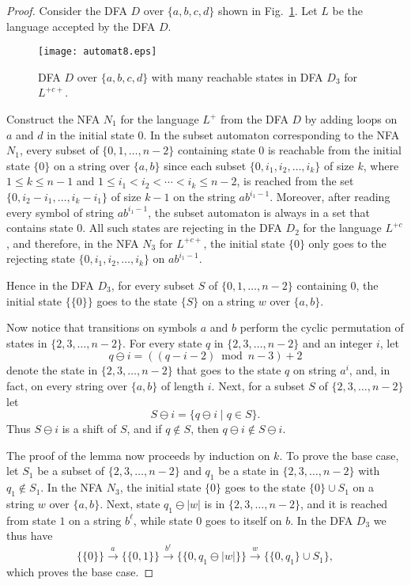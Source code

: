 \documentclass[runningheads]{llncs}
\begin{document}
\begin{proof}
 Consider the DFA $D$ over $\{a,b,c,d\}$
 shown in  Fig.~\ref{fig:max_reach}.
 Let $L$ be the language accepted by the DFA $D$.
 
 \begin{figure}[t]\label{-----fig5}
 \centering
 \texttt{[image: automat8.eps]}
 \caption{DFA $D$ over $\{a,b,c,d\}$ with many reachable states in 
         DFA $D_3$ for $L^{+c+}$.}
 \label{fig:max_reach}
 \end{figure}

 Construct the NFA $N_1$ for the language $L^+$ from the DFA $D$
 by adding loops on $a$ and $d$ in the initial state $0$.
 In the subset automaton corresponding to the NFA $N_1$,
 every subset of $\{0,1,\ldots,n-2\}$ containing state $0$
 is reachable from the initial state $\{0\}$ on a string over $\{a,b\}$
 since each subset $\{0,i_1,i_2,\ldots, i_k\}$ of size $k$,
 where $1\le k\le n-1$ and $1\le i_1<i_2<\cdots<i_k\le n-2$,
 is reached from the set $\{0,i_2-i_1,\ldots,i_k-i_1\}$ of size $k-1$
 on the string $ab^{i_1-1}$.
 Moreover, after reading every symbol of string $ab^{i_1-1}$,
 the subset automaton is always in a set that contains state $0$.
 All such states are rejecting in the DFA $D_2$ for the language $L^{+c}$,
 and therefore, in the NFA $N_3$ for $L^{+c+}$,
 the initial state $\{0\}$ only goes to the rejecting state
 $\{0,i_1,i_2,\ldots, i_k\}$ on $ab^{i_1-1}$.

 Hence in the DFA $D_3$, for every subset $S$  of $\{0,1,\ldots,n-2\}$
 containing  $0$,
 the initial state $\{\{0\}\}$ goes to the state $\{S\}$
 on a string $w$ over $\{a,b\}$.

 Now notice that transitions on symbols $a$ and $b$
 perform the cyclic permutation of states  in $\{2,3,\ldots,n-2\}$.
 For every state $q$ in $\{2,3,\ldots,n-2\}$ and an integer $i$,
 let 
 $$
    q\ominus i = ((q-i-2) \bmod n-3) + 2
 $$
 denote the state in $\{2,3,\ldots,n-2\}$
 that goes to the state $q$ on string $a^i$,
 and, in fact, on every string over $\{a,b\}$ of length $i$.
 Next, for a subset $S$ of $\{2,3,\ldots,n-2\}$ let
 $$
    S\ominus i=\{q\ominus i\mid q\in S\}.
 $$
 Thus $S\ominus i$ is a shift of $S$,
 and if $q\notin S$, then $q\ominus i\notin S\ominus i$.

 The proof of the lemma now proceeds by induction on $k$.
 To prove the base case, let $S_1$ be a subset of $\{2,3,\ldots,n-2\}$
 and $q_1$ be a state in $\{2,3,\ldots,n-2\}$ with $q_1\notin S_1$.
 In the NFA $N_3$, the initial state $\{0\}$ goes to the state $\{0\}\cup S_1$
 on a string $w$ over $\{a,b\}$.
 Next, state $q_1\ominus|w|$ is  in $\{2,3,\ldots,n-2\}$,
 and it is reached from state $1$ on a string $b^\ell$,
 while state $0$ goes to itself on $b$.
 In the DFA $D_3$ we thus have
 $$
   \big\{ \{0\} \big\}\stackrel{a}{\rightarrow}\big\{ \{0,1\} \big\}
         \stackrel{b^\ell}{\rightarrow}        \big\{ \{0,q_1\ominus|w|\} \big\}
         \stackrel{w}{\rightarrow}             \big\{ \{0,q_1\}\cup S_1 \big\},
 $$
 which proves the base case.


\end{proof}
\end{document}
